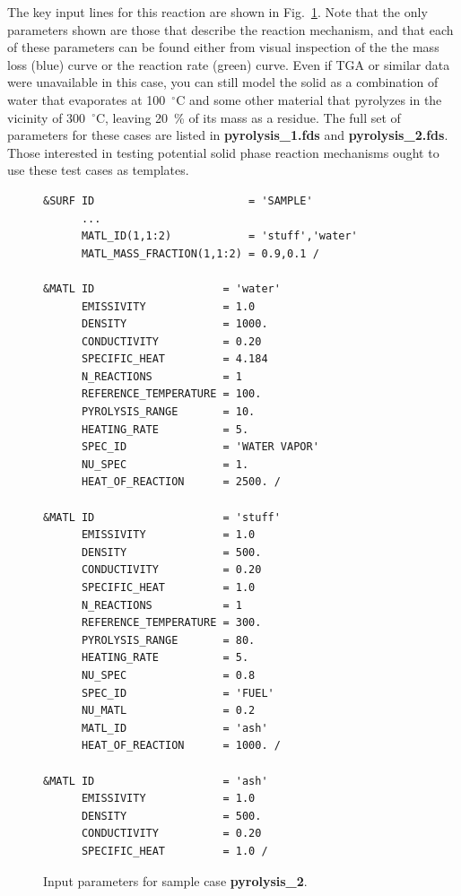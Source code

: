 \documentclass[11pt]{book}
\begin{document}
The key input lines for this reaction are shown in Fig.~\ref{pyrolysis_2_inputs}.
Note that the only parameters shown are those that describe the reaction mechanism, and that each of these parameters
can be found either from visual inspection of the the mass loss (blue) curve or the reaction rate (green) curve.
Even if TGA or similar data were unavailable in this case, you can still model the solid as a combination of water
that evaporates at 100~$^\circ$C and some other material that pyrolyzes in the vicinity of 300~$^\circ$C, leaving
20~\% of its mass as a residue.
The full set of parameters for these cases are listed in {\bf pyrolysis\_1.fds}
and {\bf pyrolysis\_2.fds}.
Those interested in testing potential solid phase reaction mechanisms ought to use these test cases as templates.

\begin{figure}[ht]
\begin{center}
\begin{minipage}{4in}
\footnotesize
\begin{verbatim}
&SURF ID                        = 'SAMPLE'
      ...
      MATL_ID(1,1:2)            = 'stuff','water'
      MATL_MASS_FRACTION(1,1:2) = 0.9,0.1 /

&MATL ID                    = 'water'
      EMISSIVITY            = 1.0
      DENSITY               = 1000.
      CONDUCTIVITY          = 0.20
      SPECIFIC_HEAT         = 4.184
      N_REACTIONS           = 1
      REFERENCE_TEMPERATURE = 100.
      PYROLYSIS_RANGE       = 10.
      HEATING_RATE          = 5.
      SPEC_ID               = 'WATER VAPOR'
      NU_SPEC               = 1.
      HEAT_OF_REACTION      = 2500. /

&MATL ID                    = 'stuff'
      EMISSIVITY            = 1.0
      DENSITY               = 500.
      CONDUCTIVITY          = 0.20
      SPECIFIC_HEAT         = 1.0
      N_REACTIONS           = 1
      REFERENCE_TEMPERATURE = 300.
      PYROLYSIS_RANGE       = 80.
      HEATING_RATE          = 5.
      NU_SPEC               = 0.8
      SPEC_ID               = 'FUEL'
      NU_MATL               = 0.2
      MATL_ID               = 'ash'
      HEAT_OF_REACTION      = 1000. /

&MATL ID                    = 'ash'
      EMISSIVITY            = 1.0
      DENSITY               = 500.
      CONDUCTIVITY          = 0.20
      SPECIFIC_HEAT         = 1.0 /
\end{verbatim} \normalsize
\end{minipage}
\end{center}
\caption[Input parameters for sample case {\bf pyrolysis\_2}.]{Input parameters for sample case {\bf pyrolysis\_2}.}
\label{pyrolysis_2_inputs}

\end{figure}
\end{document}
